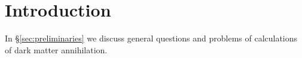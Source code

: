 \section{Introduction}

In \S\ref{sec:preliminaries} we discuss general questions and problems of calculations of dark matter annihilation.

